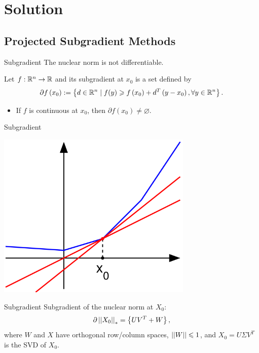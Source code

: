 \documentclass{beamer}
\begin{document}
\section{Solution}

\subsection{Projected Subgradient Methods}

\begin{frame}{Subgradient}
    The nuclear norm is not differentiable.
    \pause
    \begin{definition}[Subgradient]
        Let \(f:\mathbb R^n\to\mathbb R\) and its subgradient at \(x_0\) is a set defined by
        \[\partial f\left(x_0\right):=\left\{d\in\mathbb R^n\mid f(y)\geqslant f\left(x_0\right)+d^T\left(y-x_0\right),\forall y\in\mathbb R^n\right\}.\]
    \end{definition}
    \pause
    \begin{itemize}
        \item If \(f\) is continuous at \(x_0\), then \(\partial f\left(x_0\right)\neq\varnothing\).
    \end{itemize}
\end{frame}

\begin{frame}{Subgradient}
    \begin{center}
        \includegraphics[width=0.7\textwidth]{img/Subderivative_illustration.png}
    \end{center}
\end{frame}

\begin{frame}{Subgradient}
    Subgradient of the nuclear norm at \(X_0\):
    \[\partial\left|\left|X_0\right|\right|_\ast=\left\{UV^T+W\right\},\]
    where \(W\) and \(X\) have orthogonal row/column spaces, \(\left|\left|W\right|\right|\leqslant 1\), and \(X_0=U\Sigma V^T\) is the SVD of \(X_0\).
\end{frame}
\end{document}
